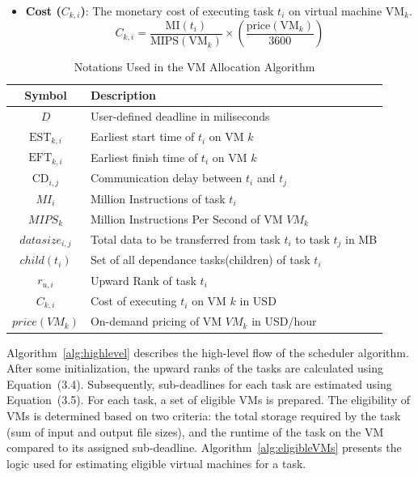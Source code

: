 \documentclass[12pt]{tcc}
\begin{document}
\begin{itemize}
    \item \textbf{Cost (\( C_{k,i} \))}:  
    The monetary cost of executing task \( t_i \) on virtual machine \( \text{VM}_k \).  
    \begin{equation}
    C_{k,i} = \frac{\text{MI}(t_i)}{\text{MIPS}(\text{VM}_k)} \times \left( \frac{\text{price}(\text{VM}_k)}{3600} \right)
    \end{equation}

\end{itemize}


\begin{table}[H]
\centering
\caption{Notations Used in the VM Allocation Algorithm}
\label{tab:notations}
\begin{tabular}{|c|l|}
\hline
\textbf{Symbol} & \textbf{Description} \\
\hline
\( D \) & User-defined deadline in miliseconds \\
\( \text{EST}_{k,i} \) & Earliest start time of \( t_i \) on VM \( k \) \\
\( \text{EFT}_{k,i} \) & Earliest finish time of \( t_i \) on VM \( k \) \\
\( \text{CD}_{i,j} \) & Communication delay between \( t_i \) and \( t_j \) \\
\( MI_{i} \) & Million Instructions of task \( t_i \) \\
\( MIPS_{k} \) & Million Instructions Per Second of VM \( VM_k \) \\
\( datasize_{i,j} \) & Total data to be transferred from task \( t_i \) to task \( t_j \) in MB \\
\( child(t_i) \) & Set of all dependance tasks(children) of task \( t_i \) \\
\( r_{u,i} \) & Upward Rank of task \( t_i \) \\
\( C_{k,i} \) & Cost of executing \( t_i \) on VM \( k \) in USD \\
\( price(VM_k) \) & On-demand pricing of VM \(VM_k\) in USD/hour \\
\hline
\end{tabular}
\end{table}
Algorithm~\ref{alg:highlevel} describes the high-level flow of the scheduler algorithm. After some initialization, the upward ranks of the tasks are calculated using Equation~(3.4). Subsequently, sub-deadlines for each task are estimated using Equation~(3.5). For each task, a set of eligible VMs is prepared. The eligibility of VMs is determined based on two criteria: the total storage required by the task (sum of input and output file sizes), and the runtime of the task on the VM compared to its assigned sub-deadline. Algorithm~\ref{alg:eligibleVMs} presents the logic used for estimating eligible virtual machines for a task.
\end{document}
